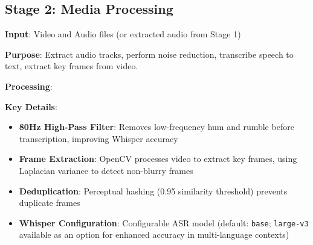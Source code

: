 \subsection{Stage 2: Media Processing}

\textbf{Input}: Video and Audio files (or extracted audio from Stage 1)

\textbf{Purpose}: Extract audio tracks, perform noise reduction, transcribe speech to text, extract key frames from video.

\textbf{Processing}:

\begin{table}[H]
\centering
\caption[Stage 2 Media Processing Workflow]{Media processing steps and transformations.}
\label{tab:stage2_media}
\end{table}

\textbf{Key Details}:
\begin{itemize}
    \item \textbf{80Hz High-Pass Filter}: Removes low-frequency hum and rumble before transcription, improving Whisper accuracy
    \item \textbf{Frame Extraction}: OpenCV processes video to extract key frames, using Laplacian variance to detect non-blurry frames
    \item \textbf{Deduplication}: Perceptual hashing (0.95 similarity threshold) prevents duplicate frames
    \item \textbf{Whisper Configuration}: Configurable ASR model (default: \texttt{base}; \texttt{large-v3} available as an option for enhanced accuracy in multi-language contexts)
\end{itemize}

